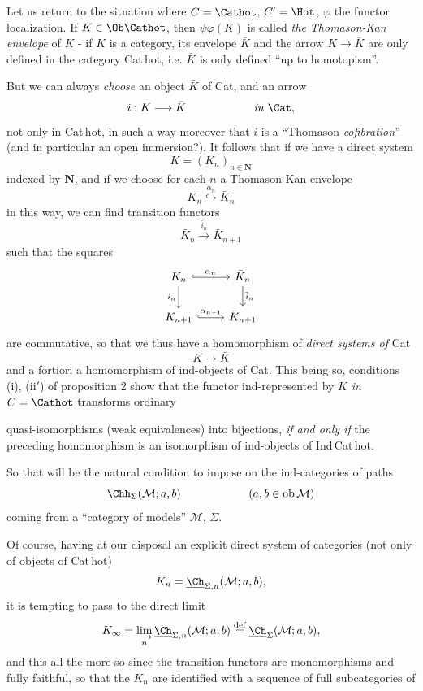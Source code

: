 Let us return to the situation where $C = \Cathot$, $C' = \Hot$, $\varphi$ the functor localization. If $K \in \Ob\Cathot$, then $\psi\varphi(K)$ is called \textit{the Thomason-Kan envelope} of $K$ - if $K$ is a category, its envelope $\bar{K}$ and the arrow $K \longrightarrow \bar{K}$ are only defined in the category Cat\,hot, i.e. $\bar{K}$ is only defined ``up to homotopism''. %

\noindent{}%
But we can always \textit{choose} an object $\bar{K}$ of Cat, and an arrow
\[
i : K \longrightarrow \bar{K} \qquad\qquad\qquad \textit{in } \Cat,
\]
not only in Cat\,hot, in such a way moreover that $i$ is a ``Thomason \textit{cofibration}'' (and in particular an open immersion?). It follows that if we have a direct system
\[
K = (K_n)_{n\in\mathbf{N}}
\]
indexed by $\mathbf{N}$, and if we choose for each $n$ a Thomason-Kan envelope
\[
K_n \overset{\alpha_n}{\hookrightarrow} \bar{K}_n
\]
in this way, we can find transition functors
\[
\bar{K}_n \xrightarrow{\bar{i}_n} \bar{K}_{n+1}
\]
such that the squares
\[
\begin{tikzcd}
K_n \arrow[r,hook,"\alpha_n"] \arrow[d,"i_n"'] & \bar{K}_n \arrow[d,"\bar{i}_n"] \\
K_{n+1} \arrow[r,hook,"\alpha_{n+1}"] & \bar{K}_{n+1}
\end{tikzcd}
\]
are commutative, so that we thus have a homomorphism of \textit{direct systems of} Cat
\[
K \longrightarrow \bar{K}
\]
and a fortiori a homomorphism of ind-objects of Cat. This being so, conditions (i), (ii$'$) of proposition 2 show that the functor ind-represented by $K$ \textit{in} $C = \Cathot$ transforms ordinary

\noindent{}%
quasi-isomorphisms (weak equivalences) into bijections, \textit{if and only if} the preceding homomorphism is an isomorphism of ind-objects of Ind\,Cat\,hot.

So that will be the natural condition to impose on the ind-categories of paths
\[
\Chh_{\Sigma}(\mathcal{M};a,b) \qquad\qquad\qquad (a,b \in \mathrm{ob}\,\mathcal{M})
\]
coming from a ``category of models'' $\mathcal{M}$, $\Sigma$.

Of course, having at our disposal an explicit direct system of categories (not only of objects of Cat\,hot)
\[
K_n = \underline{\Ch}_{\Sigma,n}(\mathcal{M};a,b),
\]
it is tempting to pass to the direct limit
\[
K_\infty = \varinjlim_n \underline{\Ch}_{\Sigma,n}(\mathcal{M};a,b) \overset{\text{def}}{=} \underline{\Ch}_{\Sigma}(\mathcal{M};a,b),
\]
and this all the more so since the transition functors are monomorphisms and fully faithful, so that the $K_n$ are identified with a sequence of full subcategories of